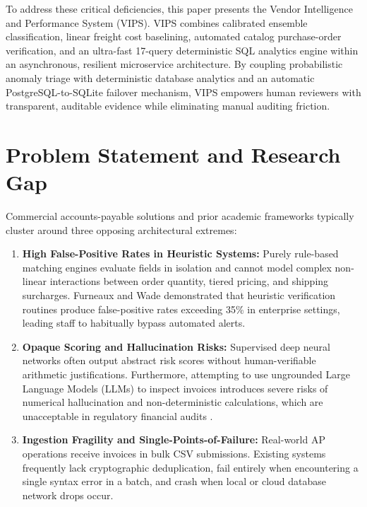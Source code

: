 \documentclass[conference]{IEEEtran}
\begin{document}
To address these critical deficiencies, this paper presents the Vendor Intelligence and Performance System (VIPS). VIPS combines calibrated ensemble classification, linear freight cost baselining, automated catalog purchase-order verification, and an ultra-fast 17-query deterministic SQL analytics engine within an asynchronous, resilient microservice architecture. By coupling probabilistic anomaly triage with deterministic database analytics and an automatic PostgreSQL-to-SQLite failover mechanism, VIPS empowers human reviewers with transparent, auditable evidence while eliminating manual auditing friction.

\section{Problem Statement and Research Gap}

Commercial accounts-payable solutions and prior academic frameworks typically cluster around three opposing architectural extremes:

\begin{enumerate}
    \item \textbf{High False-Positive Rates in Heuristic Systems:} Purely rule-based matching engines evaluate fields in isolation and cannot model complex non-linear interactions between order quantity, tiered pricing, and shipping surcharges. Furneaux and Wade \cite{furneaux} demonstrated that heuristic verification routines produce false-positive rates exceeding 35\% in enterprise settings, leading staff to habitually bypass automated alerts.
    \item \textbf{Opaque Scoring and Hallucination Risks:} Supervised deep neural networks often output abstract risk scores without human-verifiable arithmetic justifications. Furthermore, attempting to use ungrounded Large Language Models (LLMs) to inspect invoices introduces severe risks of numerical hallucination and non-deterministic calculations, which are unacceptable in regulatory financial audits \cite{ji_hallucination}.
    \item \textbf{Ingestion Fragility and Single-Points-of-Failure:} Real-world AP operations receive invoices in bulk CSV submissions. Existing systems frequently lack cryptographic deduplication, fail entirely when encountering a single syntax error in a batch, and crash when local or cloud database network drops occur.
\end{enumerate}
\end{document}
